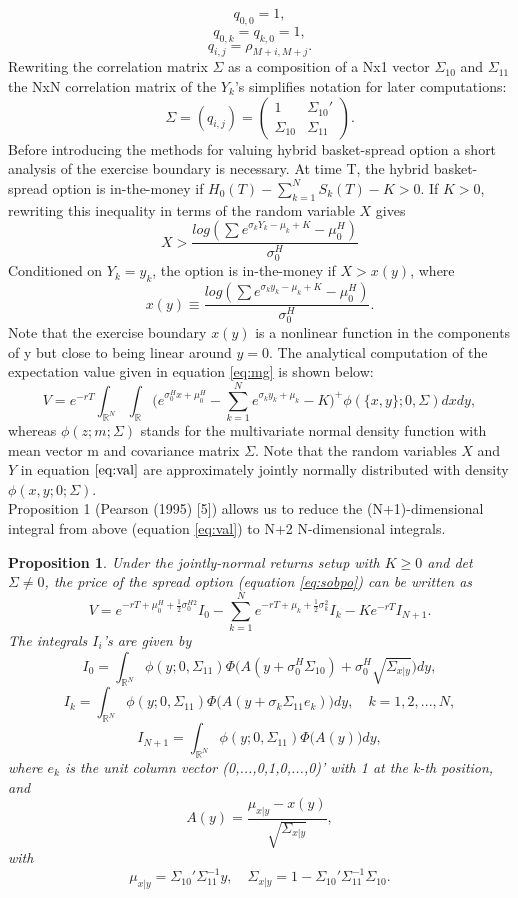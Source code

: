 \documentclass[a4paper]{article}
\newtheorem{prop}{Proposition}
\begin{document}
$$q_{0,0}=1,$$ 
$$q_{0,k}=q_{k,0}=1,$$
$$q_{i,j}=\rho_{M+i,M+j}.$$
Rewriting the correlation matrix $\Sigma$ as a composition of a Nx1 vector $\Sigma_{10}$ and $\Sigma_{11}$ the NxN correlation matrix of the $Y_k$'s simplifies notation for later computations:
$$\Sigma = (q_{i,j}) = \begin{pmatrix} 1 & \Sigma_{10}' \\ \Sigma_{10} & \Sigma_{11} \end{pmatrix}.$$ 
Before introducing the methods for valuing hybrid basket-spread option a short analysis of the exercise boundary is necessary. At time T, the hybrid basket-spread option is in-the-money 
if $H_0(T) - \sum_{k=1}^N S_k(T)-K>0$. If $K>0$, rewriting this inequality in terms of the random variable $X$ gives
$$X>\frac{log(\sum e^{\sigma_kY_k-\mu_k+K}-\mu_0^H)}{\sigma_0^H}$$
Conditioned on $Y_k=y_k$, the option is in-the-money if $X>x(y)$, where
$$x(y)\equiv\frac{log(\sum e^{\sigma_ky_k-\mu_k+K}-\mu_0^H)}{\sigma_0^H}.$$
Note that the exercise boundary $x(y)$ is a nonlinear function in the components of y but close to being linear around $y=0$.
The analytical computation of the expectation value given in equation \ref{eq:mg} is shown below:
\begin{equation}
\label{eq:val}
V= e^{-rT} \int_{\mathbb{R}^N} \int_\mathbb{R} \big(e^{\sigma_0^Hx+\mu_0^H}-\sum_{k=1}^Ne^{\sigma_ky_k+\mu_k}-K\big)^+\phi(\{x,y\};0,\Sigma) dx dy,
\end{equation}
whereas $\phi(z;m;\Sigma)$ stands for the multivariate normal density function with mean vector m and covariance matrix $\Sigma$. Note that the random variables $X$ and $Y$ in equation $\ref{eq:val}$ are approximately jointly normally distributed with density $\phi({x,y};0;\Sigma)$.\\
Proposition 1 (Pearson (1995) [5]) allows us to reduce the (N+1)-dimensional integral from above (equation \ref{eq:val}) to N+2 N-dimensional integrals.

\begin{prop}
\label{prop:price}
Under the jointly-normal returns setup with $K \geq 0$ and det $\Sigma \neq 0$, the price of the spread option (equation \ref{eq:sobpo}) can be written as
$$V=e^{-rT+\mu_0^H+\frac{1}{2}\sigma_0^{H2}}I_0-\sum_{k=1}^Ne^{-rT+\mu_k+\frac{1}{2}\sigma_k^2}I_k-Ke^{-rT}I_{N+1}.$$
The integrals $I_i$'s are given by
$$I_0=\int_{\mathbb{R}^N}\phi(y;0,\Sigma_{11})\Phi\big(A(y+\sigma_0^H\Sigma_{10})+\sigma_0^H\sqrt{\Sigma_{x|y}}\big)dy,$$
$$I_k=\int_{\mathbb{R}^N}\phi(y;0,\Sigma_{11})\Phi\big(A(y+\sigma_k\Sigma_{11}e_k)\big)dy, \quad k=1,2,...,N,$$
$$I_{N+1}=\int_{\mathbb{R}^N}\phi(y;0,\Sigma_{11})\Phi\big(A(y)\big)dy,$$
where $e_k$ is the unit column vector (0,...,0,1,0,...,0)' with 1 at the k-th position, and
$$A(y)=\frac{\mu_{x|y}-x(y)}{\sqrt{\Sigma_{x|y}}},$$
with
\begin{equation}
\label{eq:inv}
\mu_{x|y}=\Sigma_{10}'\Sigma_{11}^{-1}y, \quad \Sigma_{x|y}=1-\Sigma_{10}'\Sigma_{11}^{-1}\Sigma_{10}.
\end{equation}
\end{prop}
\end{document}
